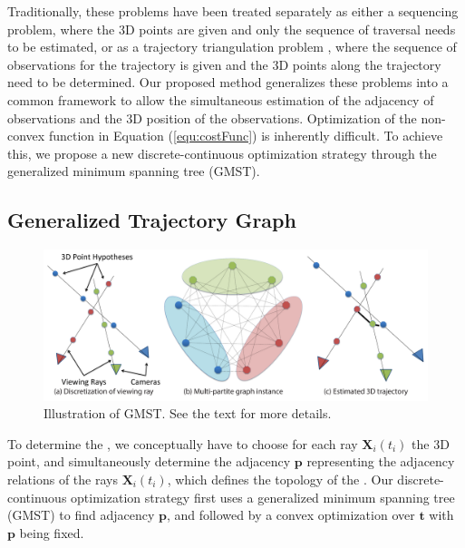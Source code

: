 Traditionally, these problems have been treated separately as either a sequencing problem,
where the 3D points are given and only the sequence of traversal needs to be estimated, or as a trajectory triangulation problem \cite{Park_ECCV2010,Valmadre_CVPR2012}, where the sequence of observations for the trajectory is given and the 3D points along the trajectory need to be determined. Our proposed method generalizes these problems into a common framework to allow the simultaneous estimation of the adjacency of observations and the 3D position of the observations. %
Optimization of the non-convex function in Equation (\ref{equ:costFunc}) is inherently difficult. To achieve this, we propose a new discrete-continuous  optimization strategy through the generalized minimum spanning tree (GMST).

\subsection{Generalized Trajectory Graph}
\begin{figure}[t]
\centering
    \includegraphics[width=1\columnwidth]{chapter4/resource/gmst_eccv.pdf}
\caption[Illustration of the generalized minimum spanning tree (GMST)]{Illustration of GMST. See the text for more details.}
\label{fig:gmst}
\end{figure}

\label{sec:gmst}
To determine the \oct, we conceptually have to choose for each ray $\mathbf{X}_i(t_i) $ the 3D point, and simultaneously determine the adjacency $\mathbf{p}$ representing the adjacency relations of the rays $\mathbf{X}_i(t_i) $, which defines the topology of the \oct.
Our discrete-continuous optimization strategy first uses a generalized minimum spanning tree (GMST) to find adjacency $\mathbf{p}$, and followed by a convex optimization over $\mathbf{t}$ with $\mathbf{p}$ being fixed.

